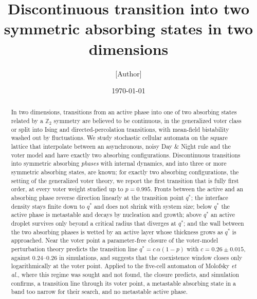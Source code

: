 \documentclass[pre,twocolumn,superscriptaddress,showpacs,floatfix]{revtex4-2}
\newcommand{\pending}[1]{{\color{red}[#1]}}
\newcommand{\qs}{q^{*}}
\begin{document}
\title{Discontinuous transition into two symmetric absorbing states in two dimensions}

\author{\pending{Author}}
\affiliation{\pending{Affiliation}}

\date{\today}

\begin{abstract}
In two dimensions, transitions from an active phase into one of two absorbing states related by a
$\mathbb{Z}_2$ symmetry are believed to be continuous, in the generalized voter class or split into
Ising and directed-percolation transitions, with mean-field bistability washed out by
fluctuations. We study stochastic cellular automata on the square lattice that interpolate
between an asynchronous, noisy Day \& Night rule and the voter model and have exactly two
absorbing configurations. Discontinuous transitions into symmetric absorbing \emph{phases} with
internal dynamics, and into three or more symmetric absorbing states, are known; for exactly two
absorbing configurations, the setting of the generalized voter theory, we report the first
transition that is fully first order, at every voter weight studied up to $p = 0.995$. Fronts
between the active and an absorbing phase reverse direction linearly at the transition point
$\qs$; the interface density stays finite down to $\qs$ and does not shrink with system size;
below $\qs$ the active phase is metastable and decays by nucleation and growth; above $\qs$ an
active droplet survives only beyond a critical radius that diverges at $\qs$; and the wall
between the two absorbing phases is wetted by an active layer whose thickness grows as $\qs$ is
approached. Near the voter point a parameter-free closure of the voter-model perturbation theory
predicts the transition line $\qs = c\,\alpha(1-p)$ with $c = 0.26\pm0.015$, against
$0.24$--$0.26$ in simulations, and suggests that the coexistence window closes only
logarithmically at the voter point. Applied to the five-cell automaton of Molofsky \emph{et al.},
where this regime was sought and not found, the closure predicts, and simulation confirms, a
transition line through its voter point, a metastable absorbing state in a band too narrow for
their search, and no metastable active phase.
\end{abstract}

\maketitle

\end{document}
